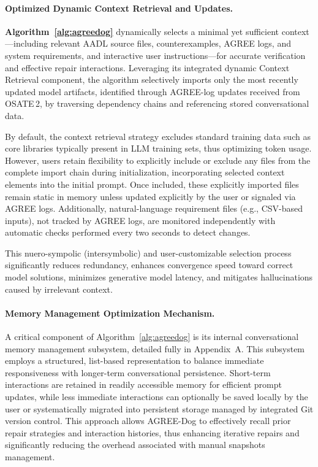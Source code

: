 \paragraph{Optimized Dynamic Context Retrieval and Updates.}
\textbf{Algorithm~\ref{alg:agreedog}} dynamically selects a minimal yet sufficient context—including relevant AADL source files, counterexamples, AGREE logs, and system requirements, and interactive user instructions—for accurate verification and effective repair interactions. Leveraging its integrated dynamic Context Retrieval component, the algorithm selectively imports only the most recently updated model artifacts, identified through AGREE-log updates received from OSATE\,2, by traversing dependency chains and referencing stored conversational data.

By default, the context retrieval strategy excludes standard training data such as core libraries typically present in LLM training sets, thus optimizing token usage. However, users retain flexibility to explicitly include or exclude any files from the complete import chain during initialization, incorporating selected context elements into the initial prompt. Once included, these explicitly imported files remain static in memory unless updated explicitly by the user or signaled via AGREE logs. Additionally, natural-language requirement files (e.g., CSV-based inputs), not tracked by AGREE logs, are monitored independently with automatic checks performed every two seconds to detect changes.

This nuero-sympolic (intersymbolic) and user-customizable selection process significantly reduces redundancy, enhances convergence speed toward correct model solutions, minimizes generative model latency, and mitigates hallucinations caused by irrelevant context.



\paragraph{Memory Management Optimization Mechanism.}

A critical component of Algorithm~\ref{alg:agreedog} is its internal conversational memory management subsystem, detailed fully in Appendix~A. This subsystem employs a structured, list-based representation to balance immediate responsiveness with longer-term conversational persistence. Short-term interactions are retained in readily accessible memory for efficient prompt updates, while less immediate interactions can optionally be saved locally by the user or systematically migrated into persistent storage managed by integrated Git version control. This approach allows AGREE-Dog to effectively recall prior repair strategies and interaction histories, thus enhancing iterative repairs and significantly reducing the overhead associated with manual snapshots management.

